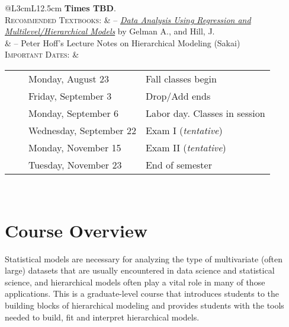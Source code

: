 \documentclass[11pt, a4paper]{article}
\newcommand{\tabitem}{~~\llap{\textbullet}~~}
\begin{document}
\begin{center}
\begin{minipage}[t]{.95\textwidth}
\begin{tabular}{@{}L{3cm}L{12.5cm}}
							\newline \textbf{Times TBD}. \\%
			\textsc{Recommended Textbooks:} & -- \href{https://www.amazon.com/gp/product/052168689X/ref=as_li_qf_sp_asin_il_tl?ie=UTF8&camp=1789&creative=9325&creativeASIN=052168689X&linkCode=as2&tag=andrsblog0f-20&linkId=PX5B5V6ZPCT2UIYV}{\textit{Data Analysis Using Regression and Multilevel/Hierarchical Models}} by Gelman A., and Hill, J.  \\
			& -- Peter Hoff's Lecture Notes on Hierarchical Modeling (Sakai) \\
			\textsc{Important Dates:} & \begin{minipage}[t]{.95\textwidth}
				\begin{tabular}{@{}ll}
					\tabitem Monday, August 23	& Fall classes begin \\
					\tabitem Friday, September 3	& Drop/Add ends \\
					\tabitem Monday, September 6 & Labor day. Classes in session \\
					\tabitem Wednesday, September 22 & Exam I (\textit{tentative})\\
					\tabitem Monday, November 15 & Exam II (\textit{tentative})\\
					\tabitem Tuesday, November 23 &	End of semester \\
				\end{tabular}
			\end{minipage} \\
			\bottomrule[0.065cm]
		\end{tabular}
	\end{minipage}
\end{center}



\vspace{.5cm}
\setlength{\unitlength}{1in}
\renewcommand{\arraystretch}{1.5}



\section{Course Overview}
Statistical models are necessary for analyzing the type of multivariate (often large) datasets that are usually encountered in data science and statistical science, and hierarchical models often play a vital role in many of those applications. This is a graduate-level course that introduces students to the building blocks of hierarchical modeling and provides students with the tools needed to build, fit and interpret hierarchical models.
\end{document}
